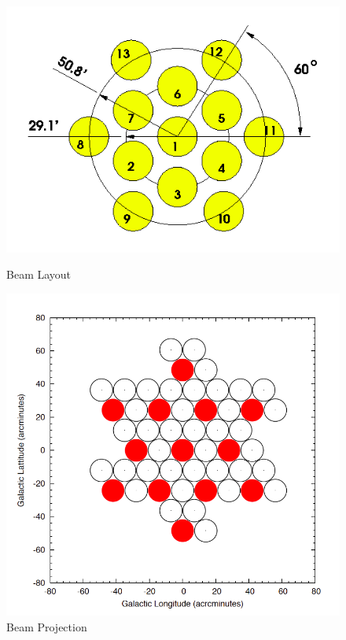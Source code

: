 \documentclass[11pt,fleqn]{book} %
\begin{document}
\begin{figure}[!tbp]
  \centering
  \begin{minipage}[b]{0.4\textwidth}
    \includegraphics[width=\textwidth]{beam1.png}
    \caption{Beam Layout}
  \end{minipage}
  \hfill
  \begin{minipage}[b]{0.4\textwidth}
    \includegraphics[width=\textwidth]{beam2.png}
    \caption{Beam Projection}
  \end{minipage}
\end{figure}
\end{document}

